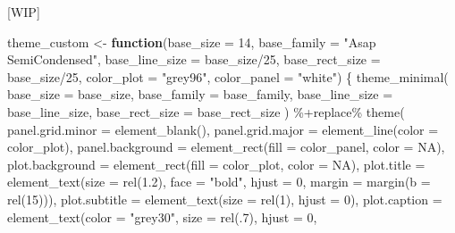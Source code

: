 \documentclass[
]{krantz}
\makeatletter
\newenvironment{Shaded}{\begin{snugshade}}{\end{snugshade}}
\newcommand{\AttributeTok}[1]{\textcolor[rgb]{0.61,0.61,0.61}{#1}}
\newcommand{\ConstantTok}[1]{\textcolor[rgb]{0,0,0}{#1}}
\newcommand{\ControlFlowTok}[1]{\textcolor[rgb]{0.27,0.27,0.27}{\textbf{#1}}}
\newcommand{\DecValTok}[1]{\textcolor[rgb]{0.06,0.06,0.06}{#1}}
\newcommand{\FloatTok}[1]{\textcolor[rgb]{0.06,0.06,0.06}{#1}}
\newcommand{\FunctionTok}[1]{\textcolor[rgb]{0,0,0}{#1}}
\newcommand{\NormalTok}[1]{#1}
\newcommand{\OtherTok}[1]{\textcolor[rgb]{0.37,0.37,0.37}{#1}}
\newcommand{\SpecialCharTok}[1]{\textcolor[rgb]{0,0,0}{#1}}
\newcommand{\StringTok}[1]{\textcolor[rgb]{0.5,0.5,0.5}{#1}}
\newenvironment{kframe}{%
\medskip{}
\setlength{\fboxsep}{.8em}
 \def\at@end@of@kframe{}%
 \ifinner\ifhmode%
  \def\at@end@of@kframe{\end{minipage}}%
  \begin{minipage}{\columnwidth}%
 \fi\fi%
 \def\FrameCommand##1{\hskip\@totalleftmargin \hskip-\fboxsep
 \colorbox{shadecolor}{##1}\hskip-\fboxsep
     \hskip-\linewidth \hskip-\@totalleftmargin \hskip\columnwidth}%
 \MakeFramed {\advance\hsize-\width
   \@totalleftmargin\z@ \linewidth\hsize
   \@setminipage}}%
 {\par\unskip\endMakeFramed%
 \at@end@of@kframe}
\renewenvironment{Shaded}{\begin{kframe}}{\end{kframe}}
\makeatother
\begin{document}
{[}WIP{]}

\begin{Shaded}
\begin{Highlighting}[]
\NormalTok{theme\_custom }\OtherTok{\textless{}{-}} \ControlFlowTok{function}\NormalTok{(}\AttributeTok{base\_size =} \DecValTok{14}\NormalTok{, }\AttributeTok{base\_family =} \StringTok{"Asap SemiCondensed"}\NormalTok{, }
                         \AttributeTok{base\_line\_size =}\NormalTok{ base\_size}\SpecialCharTok{/}\DecValTok{25}\NormalTok{, }\AttributeTok{base\_rect\_size =}\NormalTok{ base\_size}\SpecialCharTok{/}\DecValTok{25}\NormalTok{,}
                         \AttributeTok{color\_plot =} \StringTok{"grey96"}\NormalTok{, }\AttributeTok{color\_panel =} \StringTok{"white"}\NormalTok{) \{}
    \FunctionTok{theme\_minimal}\NormalTok{(}
      \AttributeTok{base\_size =}\NormalTok{ base\_size, }\AttributeTok{base\_family =}\NormalTok{ base\_family, }
      \AttributeTok{base\_line\_size =}\NormalTok{ base\_line\_size, }\AttributeTok{base\_rect\_size =}\NormalTok{ base\_rect\_size}
\NormalTok{    ) }\SpecialCharTok{\%+replace\%} 
    \FunctionTok{theme}\NormalTok{(}
      \AttributeTok{panel.grid.minor =} \FunctionTok{element\_blank}\NormalTok{(),}
      \AttributeTok{panel.grid.major =} \FunctionTok{element\_line}\NormalTok{(}\AttributeTok{color =}\NormalTok{ color\_plot),}
      \AttributeTok{panel.background =} \FunctionTok{element\_rect}\NormalTok{(}\AttributeTok{fill =}\NormalTok{ color\_panel, }\AttributeTok{color =} \ConstantTok{NA}\NormalTok{),}
      \AttributeTok{plot.background =} \FunctionTok{element\_rect}\NormalTok{(}\AttributeTok{fill =}\NormalTok{ color\_plot, }\AttributeTok{color =} \ConstantTok{NA}\NormalTok{),}
      \AttributeTok{plot.title =} \FunctionTok{element\_text}\NormalTok{(}\AttributeTok{size =} \FunctionTok{rel}\NormalTok{(}\FloatTok{1.2}\NormalTok{), }\AttributeTok{face =} \StringTok{"bold"}\NormalTok{, }\AttributeTok{hjust =} \DecValTok{0}\NormalTok{,}
                                  \AttributeTok{margin =} \FunctionTok{margin}\NormalTok{(}\AttributeTok{b =} \FunctionTok{rel}\NormalTok{(}\DecValTok{15}\NormalTok{))), }
      \AttributeTok{plot.subtitle =} \FunctionTok{element\_text}\NormalTok{(}\AttributeTok{size =} \FunctionTok{rel}\NormalTok{(}\DecValTok{1}\NormalTok{), }\AttributeTok{hjust =} \DecValTok{0}\NormalTok{),}
      \AttributeTok{plot.caption =} \FunctionTok{element\_text}\NormalTok{(}\AttributeTok{color =} \StringTok{"grey30"}\NormalTok{, }\AttributeTok{size =} \FunctionTok{rel}\NormalTok{(.}\DecValTok{7}\NormalTok{), }\AttributeTok{hjust =} \DecValTok{0}\NormalTok{,}

\end{Highlighting}
\end{Shaded}
\end{document}
